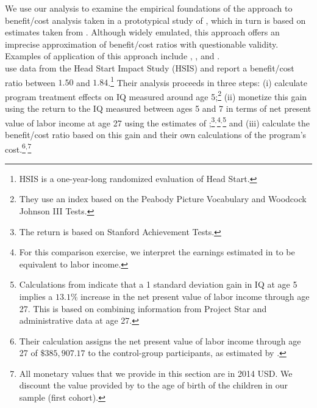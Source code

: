\noindent We use our analysis to examine the empirical foundations of the approach to benefit/cost analysis taken in a prototypical study of \citet{Kline_Walters_2016_QJE}, which in turn is based on estimates taken from \citet{Chetty_Friedman_etal_2011_QJoE}. Although widely emulated, this approach offers an imprecise approximation of benefit/cost ratios with questionable validity. Examples of application of this approach include \citet{Attanasio_Kugler_Meghir_2011_AEJAE}, \cite{Behrman-et-al_2011_JHR-Progresa}, and \cite{Deshpande_Yue_2017_Screened_Unpublished}.\\

\noindent \citet{Kline_Walters_2016_QJE} use data from the Head Start Impact Study (HSIS) and report a benefit/cost ratio between $1.50$ and $1.84$.\footnote{HSIS is a one-year-long randomized evaluation of Head Start.} Their analysis proceeds in three steps: (i) calculate program treatment effects on IQ measured around age 5;\footnote{They use an index based on the Peabody Picture Vocabulary and Woodcock Johnson III Tests.} (ii) monetize this gain using the return to the IQ measured between ages 5 and 7 in terms of net present value of labor income at age 27 using the estimates of \citet{Chetty_Friedman_etal_2011_QJoE};\footnote{The \citet{Chetty_Friedman_etal_2011_QJoE} return is based on Stanford Achievement Tests.}$^,$\footnote{For this comparison exercise, we interpret the earnings estimated in \citet{Chetty_Friedman_etal_2011_QJoE} to be equivalent to labor income.}$^,$\footnote{Calculations from \citet{Chetty_Friedman_etal_2011_QJoE} indicate that a 1 standard deviation gain in IQ at age 5 implies a $13.1\%$ increase in the net present value of labor income through age 27. This is based on combining information from Project Star and administrative data at age 27.} and (iii) calculate the benefit/cost ratio based on this gain and their own calculations of the program's cost.\footnote{Their calculation assigns the net present value of labor income through age 27 of $\$385,907.17$ to the control-group participants, as estimated by  \citet{Chetty_Friedman_etal_2011_QJoE}.}$^,$\footnote{All monetary values that we provide in this section are in 2014 USD. We discount the value provided by \citet{Chetty_Friedman_etal_2011_QJoE} to the age of birth of the children in our sample (first cohort).}\\

